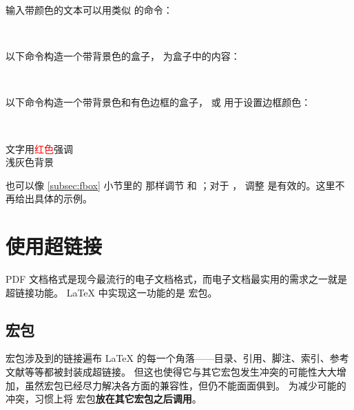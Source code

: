 输入带颜色的文本可以用类似  的命令：
\begin{command}
 \\
\end{command}

以下命令构造一个带背景色的盒子， 为盒子中的内容：
\begin{command}
 \\
\end{command}

以下命令构造一个带背景色和有色边框的盒子， 或  用于设置边框颜色：
\begin{command}
 \\
\end{command}

\begin{example}
\sffamily
文字用\textcolor{red}{红色}强调\\
\colorbox[gray]{0.95}{浅灰色背景} \\
\end{example}

 也可以像 \ref{subsec:fbox} 小节里的  那样调节  和 ；对于 ，
调整  是有效的。这里不再给出具体的示例。

\section{使用超链接}\label{sec:hyperlinks}

PDF 文档格式是现今最流行的电子文档格式，而电子文档最实用的需求之一就是超链接功能。
\LaTeX{} 中实现这一功能的是  宏包。

\subsection{ 宏包}\label{subsec:hyperref}

 宏包涉及到的链接遍布 \LaTeX{} 的每一个角落——目录、引用、脚注、索引、参考文献等等都被封装成超链接。
但这也使得它与其它宏包发生冲突的可能性大大增加，虽然宏包已经尽力解决各方面的兼容性，但仍不能面面俱到。
为减少可能的冲突，习惯上将  宏包\textbf{放在其它宏包之后调用}。

